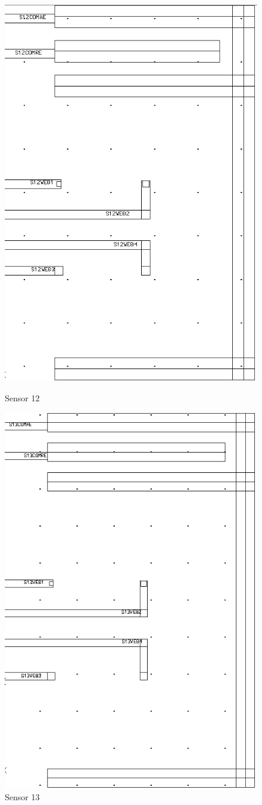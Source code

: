 \begin{description}
\begin{figure}
	\begin{minipage}{0.5\linewidth}
		\centering
		\includegraphics[width=0.6\linewidth]{figures/s12.png}
		\caption{Sensor 12}
		\label{s12}
	\end{minipage}
	\begin{minipage}{0.5\linewidth}
		\centering
		\includegraphics[width=0.6\linewidth]{figures/s13.png}
		\caption{Sensor 13}
		\label{s13}
	\end{minipage}
\end{figure}


\end{description}
